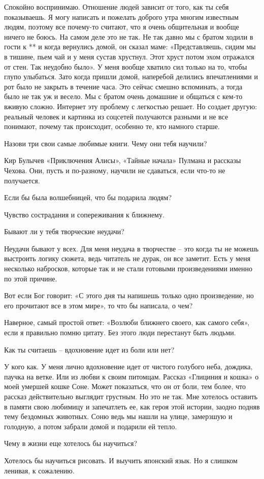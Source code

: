 Спокойно воспринимаю. Отношение людей зависит от того, как ты себя показываешь.
Я могу написать и пожелать доброго утра многим известным людям, поэтому все
почему-то считают, что я очень общительная и вообще ничего не боюсь. На самом
деле это не так. Не так давно мы с братом ходили в гости к ** и когда вернулись
домой, он сказал маме: «Представляешь, сидим мы в тишине, пьем чай и у меня
сустав хрустнул. Этот хруст потом эхом отражался от стен. Так неудобно было». У
меня вообще хватило сил только на то, чтобы глупо улыбаться. Зато когда пришли
домой, наперебой делились впечатлениями и рот было не закрыть в течение часа.
Это сейчас смешно вспоминать, а тогда было не так уж и весело. Мы с братом
очень домашние и общаться с кем-то вживую сложно. Интернет эту проблему с
легкостью решает. Но создает другую: реальный человек и картинка из соцсетей
получаются разными и не все понимают, почему так происходит, особенно те, кто
намного старше.

Назови три свои самые любимые книги. Чему они тебя научили?

Кир Булычев «Приключения Алисы», «Тайные начала» Пулмана и рассказы Чехова.
Они, пусть и по-разному, научили не сдаваться, если что-то не получается.

Если бы была волшебницей, что бы подарила людям?

Чувство сострадания и сопереживания к ближнему.

Бывают ли у тебя творческие неудачи?

Неудачи бывают у всех. Для меня неудача в творчестве – это когда ты не можешь
выстроить логику сюжета, ведь читатель не дурак, он все заметит. Есть у меня
несколько набросков, которые так и не стали готовыми произведениями именно по
этой причине.

Вот если Бог говорит: «С этого дня ты напишешь только одно произведение, но его
прочитают все в этом мире», то что бы написала, о чем?

Наверное, самый простой ответ: «Возлюби ближнего своего, как самого себя», если
я правильно помню цитату. Без этого люди перестанут быть людьми.

Как ты считаешь – вдохновение идет из боли или нет?

У кого как. У меня лично вдохновение идет от чистого голубого неба, дождика,
паучка на ветке. Или из любви к своим питомцам. Рассказ «Глициния и кошка» о
моей умершей кошке Соне. Может показаться, что он от боли, тем более, что
рассказ действительно выглядит грустным. Но это не так. Мне хотелось оставить в
памяти свою любимицу и запечатлеть ее, как героя этой истории, заодно подняв
тему бездомных животных. Соню ведь мы нашли на улице, замерзшую и голодную, а
потом забрали домой и подарили ей тепло.

Чему в жизни еще хотелось бы научиться?

Хотелось бы научиться рисовать. И выучить японский язык. Но я слишком ленивая,
к сожалению.
